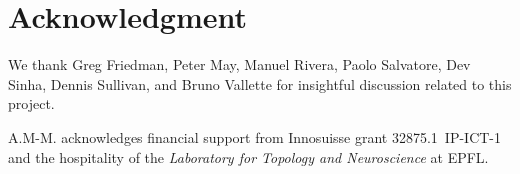 
\section*{Acknowledgment}

We thank Greg Friedman, Peter May, Manuel Rivera, Paolo Salvatore, Dev Sinha, Dennis Sullivan, and Bruno Vallette for insightful discussion related to this project.

A.M-M. acknowledges financial support from Innosuisse grant 32875.1~IP-ICT-1 and the hospitality of the \textit{Laboratory for Topology and Neuroscience} at EPFL.

